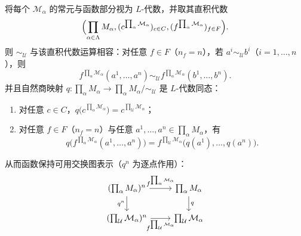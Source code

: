 \documentclass[lang=cn,a4paper,newtx,section]{elegantbook}
\begin{document}
 \begin{proposition}[同余与自然投影]
 \label{ultraproduct-congruence-projection}
 将每个 $\mathcal M_{\alpha}$ 的常元与函数部分视为 $L$-代数，并取其直积代数
 \[
   \Bigl(\prod_{\alpha\in\Lambda}M_{\alpha},(c^{\prod_{\alpha}\mathcal M_{\alpha}})_{c\in C},(f^{\prod_{\alpha}\mathcal M_{\alpha}})_{f\in F}\Bigr).
 \]
 则 $\sim_{\mathcal U}$ 与该直积代数运算相容：对任意 $f\in F$（$n_f=n$），若 $a^{i}\sim_{\mathcal U} b^{i}$（$i=1,\dots,n$），则
 \[
   f^{\prod_{\alpha}\mathcal M_{\alpha}}(a^{1},\dots,a^{n})\sim_{\mathcal U} f^{\prod_{\alpha}\mathcal M_{\alpha}}(b^{1},\dots,b^{n}).
 \]
 并且自然商映射 $q:\prod_{\alpha}M_{\alpha}\to\prod_{\alpha}M_{\alpha}/\!\sim_{\mathcal U}$ 是 $L$-代数同态：
 \begin{enumerate}
  \item 对任意 $c\in C$，$q\bigl(c^{\prod_{\alpha}\mathcal M_{\alpha}}\bigr)=c^{\prod_{\mathcal U}\mathcal M_{\alpha}}$；
  \item 对任意 $f\in F$（$n_f=n$）与任意 $a^{1},\dots,a^{n}\in\prod_{\alpha}M_{\alpha}$，有
  \[
    q\bigl(f^{\prod_{\alpha}\mathcal M_{\alpha}}(a^{1},\dots,a^{n})\bigr)=f^{\prod_{\mathcal U}\mathcal M_{\alpha}}\bigl(q(a^{1}),\dots,q(a^{n})\bigr).
  \]
 \end{enumerate}
 从而函数保持可用交换图表示（$q^{n}$ 为逐点作用）：
 \[
 \begin{tikzcd}
 (\prod_{\alpha}M_{\alpha})^{n} \arrow[r, "f^{\prod_{\alpha}\mathcal M_{\alpha}}"] \arrow[d, "q^{n}"'] & \prod_{\alpha}M_{\alpha} \arrow[d, "q"] \\
 (\prod_{\mathcal U}\mathcal M_{\alpha})^{n} \arrow[r, "f^{\prod_{\mathcal U}\mathcal M_{\alpha}}"'] & \prod_{\mathcal U}\mathcal M_{\alpha}
 \end{tikzcd}
 \]
 \end{proposition}
\end{document}
